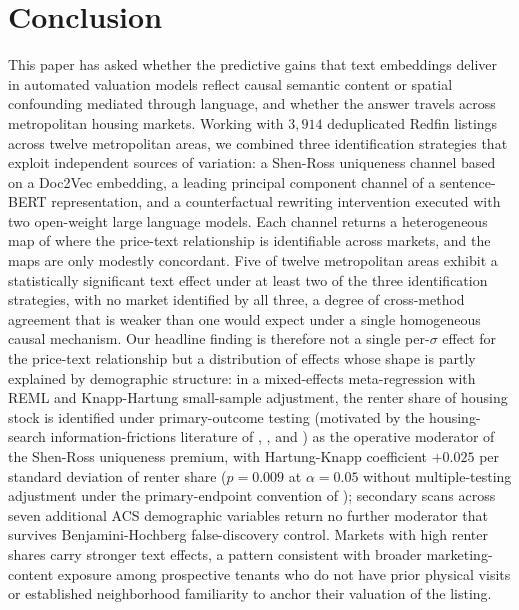 
\section{Conclusion}
\label{sec:conclusion}

This paper has asked whether the predictive gains that text embeddings
deliver in automated valuation models reflect causal semantic content
or spatial confounding mediated through language, and whether the
answer travels across metropolitan housing markets.  Working with $3{,}914$ deduplicated Redfin listings across twelve metropolitan areas, we
combined three identification strategies that exploit independent
sources of variation: a Shen-Ross uniqueness channel based on a
Doc2Vec embedding, a leading principal component channel of a
sentence-BERT representation, and a counterfactual rewriting
intervention executed with two open-weight large language models.
Each channel returns a heterogeneous map of where the price-text
relationship is identifiable across markets, and the maps are only
modestly concordant. Five of twelve metropolitan areas exhibit a statistically significant text effect under at least two of the three identification strategies, with no market identified by all three, a degree of cross-method agreement that is weaker than one would expect under a single homogeneous causal mechanism.  Our headline finding is therefore not a single per-$\sigma$
effect for the price-text relationship but a distribution of effects
whose shape is partly explained by demographic structure: in a
mixed-effects meta-regression with REML and Knapp-Hartung small-sample
adjustment, the renter share of housing stock is identified under primary-outcome testing (motivated by the housing-search information-frictions literature of \citet{stigler1961economics}, \citet{genesove1997equity}, and \citet{anenberg2020housing}) as the operative moderator of the Shen-Ross uniqueness premium, with Hartung-Knapp coefficient $+0.025$ per standard deviation of renter share ($p = 0.009$ at $\alpha = 0.05$ without multiple-testing adjustment under the primary-endpoint convention of \citet{westfall2001optimally}); secondary scans across seven additional ACS demographic variables return no further moderator that survives Benjamini-Hochberg false-discovery control. Markets with high renter shares carry stronger
text effects, a pattern consistent with broader marketing-content
exposure among prospective tenants who do not have prior physical
visits or established neighborhood familiarity to anchor their
valuation of the listing.

